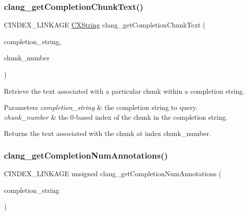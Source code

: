 \subsubsection{\texorpdfstring{clang\+\_\+get\+Completion\+Chunk\+Text()}{clang\_getCompletionChunkText()}}
{\footnotesize\ttfamily C\+I\+N\+D\+E\+X\+\_\+\+L\+I\+N\+K\+A\+GE \hyperlink{structCXString}{C\+X\+String} clang\+\_\+get\+Completion\+Chunk\+Text (\begin{DoxyParamCaption}\item[{\hyperlink{group__CINDEX__CODE__COMPLET_gafea23a43a60ec3b4f3bedccfbb76883a}{C\+X\+Completion\+String}}]{completion\+\_\+string,  }\item[{unsigned}]{chunk\+\_\+number }\end{DoxyParamCaption})}



Retrieve the text associated with a particular chunk within a completion string. 


\begin{DoxyParams}{Parameters}
{\em completion\+\_\+string} & the completion string to query.\\
\hline
{\em chunk\+\_\+number} & the 0-\/based index of the chunk in the completion string.\\
\hline
\end{DoxyParams}
\begin{DoxyReturn}{Returns}
the text associated with the chunk at index {\ttfamily chunk\+\_\+number}. 
\end{DoxyReturn}
\mbox{\label{group__CINDEX__CODE__COMPLET_gadce9960ed8d554f497eda0457a3d52f9}} 
\subsubsection{\texorpdfstring{clang\+\_\+get\+Completion\+Num\+Annotations()}{clang\_getCompletionNumAnnotations()}}
{\footnotesize\ttfamily C\+I\+N\+D\+E\+X\+\_\+\+L\+I\+N\+K\+A\+GE unsigned clang\+\_\+get\+Completion\+Num\+Annotations (\begin{DoxyParamCaption}\item[{\hyperlink{group__CINDEX__CODE__COMPLET_gafea23a43a60ec3b4f3bedccfbb76883a}{C\+X\+Completion\+String}}]{completion\+\_\+string }\end{DoxyParamCaption})}




